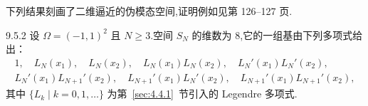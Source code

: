 下列结果刻画了二维逼近的伪模态空间,证明例如见第 126–127 页.

\begin{theorem}[]{9.5.2}
设 \(\Omega=(-1,1)^2\) 且 \(N\ge3\).空间 \(S_N\) 的维数为 \(8\),它的一组基由下列多项式给出：
\begin{equation}\label{eq:9.5.13}
  \begin{gathered}
    1,\quad L_N(x_1),\quad L_N(x_2),\quad L_N(x_1)L_N(x_2),\quad
          L_N'(x_1)L_N'(x_2),\\
    L_N'(x_1)L_{N+1}'(x_2),\quad L_{N+1}'(x_1)L_N'(x_2),\quad
       L_{N+1}'(x_1)L_{N+1}'(x_2),
  \end{gathered}
\end{equation}
其中 \(\{L_k\mid k=0,1,\ldots\}\) 为第~\ref{sec:4.4.1}~节引入的 Legendre 多项式.
\end{theorem}


